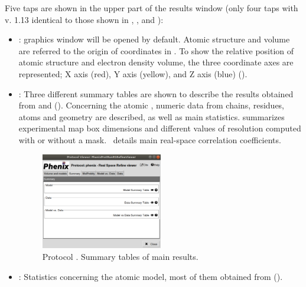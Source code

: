\begin{itemize}
Five taps are shown in the upper part of the results window (only four taps with \phenix v. 1.13 identical to those shown in , ,  and ):
   \begin{itemize}
     \item {}: \chimera graphics window will be opened by default. Atomic structure and volume are referred to the origin of coordinates in \chimera. To show the relative position of atomic structure and electron density volume, the three coordinate axes are represented; X axis (red), Y axis (yellow), and Z axis (blue) ().
     \item {}: Three different summary tables are shown to describe the results obtained from  and  (). Concerning the atomic , numeric data from chains, residues, atoms and geometry are described, as well as main \molprobity statistics.  summarizes experimental map box dimensions and different values of resolution computed with or without a mask. \ details main real-space correlation coefficients.
        \begin{figure}[H]
         \centering 
         \captionsetup{width=.9\linewidth} 
         \includegraphics[width=0.50\textwidth]{Images_appendix/Fig150_0.pdf}
         \caption{Protocol . Summary tables of main\phenix {} results.}
         \label{fig:app_protocol_real_space_refine_2_1}
        \end{figure}
     \item {}: Statistics concerning the atomic model, most of them obtained from \molprobity ().
        \begin{figure}[H]

\end{figure}
\end{itemize}
\end{itemize}
